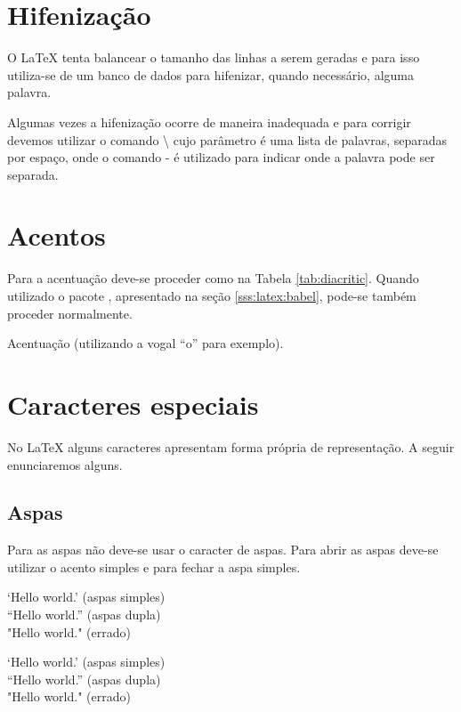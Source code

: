 \section{Hifenização}

O LaTeX tenta balancear o tamanho das linhas a serem geradas e para isso utiliza-se de um banco de dados para hifenizar, quando necessário, alguma palavra.

Algumas vezes a hifenização ocorre de maneira inadequada e para corrigir devemos utilizar o comando \textbackslash{} cujo parâmetro é uma lista de palavras, separadas por espaço, onde o comando - é utilizado para indicar onde a palavra pode ser separada.

\section{Acentos}
Para a acentuação deve-se proceder como na Tabela \ref{tab:diacritic}. Quando utilizado o pacote , apresentado na seção \ref{sss:latex:babel}, pode-se também proceder normalmente.
\begin{table}[!htb]
    \centering
    \caption{Acentuação (utilizando a vogal ``o'' para exemplo).} \label{tab:diacritic}
    
\end{table}

\section{Caracteres especiais}
No LaTeX alguns caracteres apresentam forma própria de representação. A seguir enunciaremos alguns.

\subsection{Aspas}
Para as aspas não deve-se usar o caracter de aspas. Para abrir as aspas deve-se utilizar o acento simples e para fechar a aspa simples. \\
\begin{minipage}[t]{0.47\linewidth} \vspace{-8pt}
    \begin{latexcode}
        `Hello world.' (aspas simples) \\
        ``Hello world.'' (aspas dupla) \\
        "Hello world." (errado)
    \end{latexcode}
\end{minipage} \hfill
\begin{minipage}[t]{0.47\linewidth} \vspace{0pt}
    `Hello world.' (aspas simples) \\
    ``Hello world.'' (aspas dupla) \\
    "Hello world." (errado)
\end{minipage}

